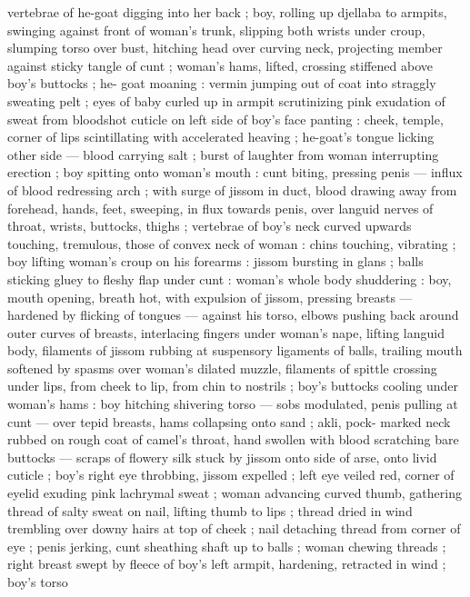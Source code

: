 vertebrae of he-goat digging into her back ; boy, rolling up djellaba 
to armpits, swinging against front of woman's trunk, slipping both 
wrists under croup, slumping torso over bust, hitching head over 
curving neck, projecting member against sticky tangle of cunt ; 
woman's hams, lifted, crossing stiffened above boy's buttocks ; he- 
goat moaning : vermin jumping out of coat into straggly sweating 
pelt ; eyes of baby curled up in armpit scrutinizing pink exudation of 
sweat from bloodshot cuticle on left side of boy's face panting : 
cheek, temple, corner of lips scintillating with accelerated heaving ; 
he-goat's tongue licking other side --- blood carrying salt ; burst of 
laughter from woman interrupting erection ; boy spitting onto 
woman's mouth : cunt biting, pressing penis --- influx of blood 
redressing arch ; with surge of jissom in duct, blood drawing away 
from forehead, hands, feet, sweeping, in flux towards penis, over 
languid nerves of throat, wrists, buttocks, thighs ; vertebrae of boy's 
neck curved upwards touching, tremulous, those of convex neck of 
woman : chins touching, vibrating ; boy lifting woman's croup on his 
forearms : jissom bursting in glans ; balls sticking gluey to fleshy flap 
under cunt : woman's whole body shuddering : boy, mouth opening, 
breath hot, with expulsion of jissom, pressing breasts --- hardened 
by flicking of tongues --- against his torso, elbows pushing back 
around outer curves of breasts, interlacing fingers under woman's 
nape, lifting languid body, filaments of jissom rubbing at suspensory 
ligaments of balls, trailing mouth softened by spasms over woman's 
dilated muzzle, filaments of spittle crossing under lips, from cheek to 
lip, from chin to nostrils ; boy's buttocks cooling under woman's 
hams : boy hitching shivering torso --- sobs modulated, penis pulling 
at cunt --- over tepid breasts, hams collapsing onto sand ; akli, pock- 
marked neck rubbed on rough coat of camel's throat, hand swollen 
with blood scratching bare buttocks --- scraps of flowery silk stuck 
by jissom onto side of arse, onto livid cuticle ; boy's right eye 
throbbing, jissom expelled ; left eye veiled red, corner of eyelid 
exuding pink lachrymal sweat ; woman advancing curved thumb, 
gathering thread of salty sweat on nail, lifting thumb to lips ; thread 
dried in wind trembling over downy hairs at top of cheek ; nail 
detaching thread from corner of eye ; penis jerking, cunt sheathing 
shaft up to balls ; woman chewing threads ; right breast swept by 
fleece of boy's left armpit, hardening, retracted in wind ; boy's torso 
